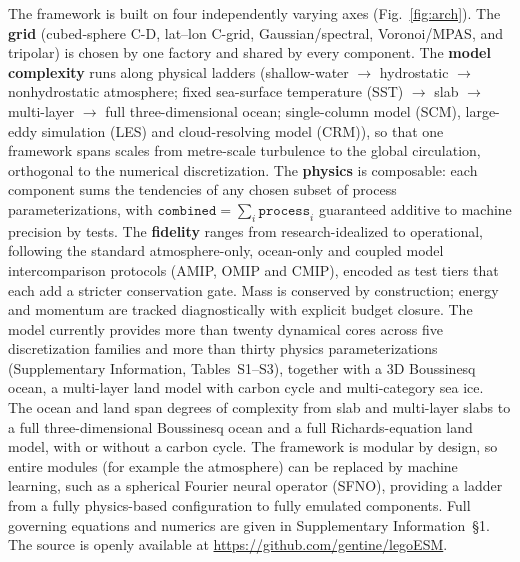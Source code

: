 \documentclass[11pt]{article}
\newcommand{\repourl}{https://github.com/gentine/legoESM}
\begin{document}
The framework is built on four independently varying axes (Fig.~\ref{fig:arch}). The \textbf{grid} (cubed-sphere C-D,
lat--lon C-grid, Gaussian/spectral, Voronoi/MPAS, and tripolar) is chosen by one factory and
shared by every component. The \textbf{model complexity} runs along physical ladders
(shallow-water $\rightarrow$ hydrostatic $\rightarrow$ nonhydrostatic atmosphere; fixed
sea-surface temperature (SST) $\rightarrow$ slab $\rightarrow$ multi-layer $\rightarrow$ full
three-dimensional ocean; single-column model (SCM), large-eddy simulation (LES) and
cloud-resolving model (CRM)), so that one framework spans scales from metre-scale turbulence to
the global circulation, orthogonal to the numerical discretization. The \textbf{physics} is composable:
each component sums the tendencies of any chosen subset of process parameterizations, with
$\texttt{combined}=\sum_i\texttt{process}_i$ guaranteed additive to machine precision by tests.
The \textbf{fidelity} ranges from research-idealized to operational, following the standard
atmosphere-only, ocean-only and coupled model intercomparison protocols (AMIP, OMIP and CMIP),
encoded as test tiers that each add a stricter conservation gate. Mass is conserved by construction; energy
and momentum are tracked diagnostically with explicit budget closure. The model currently
provides more than twenty dynamical cores across five discretization families and more than
thirty physics parameterizations (Supplementary Information, Tables~S1--S3), together with a
3D Boussinesq ocean, a multi-layer land model with carbon cycle and multi-category sea ice. The
ocean and land span degrees of complexity from slab and multi-layer slabs to a full
three-dimensional Boussinesq ocean and a full Richards-equation land model, with or without a
carbon cycle. The framework is modular by design, so entire modules (for example the atmosphere)
can be replaced by machine learning, such as a spherical Fourier neural operator (SFNO), providing
a ladder from a fully physics-based configuration to fully emulated components. Full governing equations and
numerics are given in Supplementary Information~\S1. The source is openly available at
\url{\repourl}.
\end{document}
